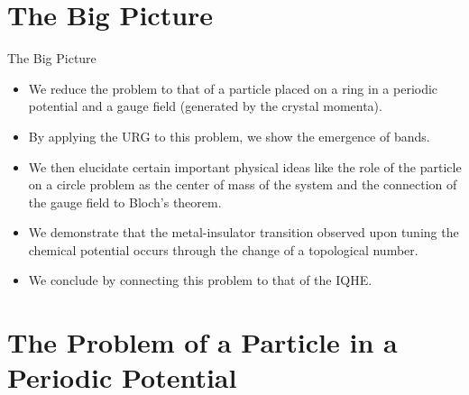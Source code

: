 \documentclass[aspectratio=169]{beamer}
\begin{document}
\section{The Big Picture}

\begin{frame}{The Big Picture}
\begin{itemize}[<+->]
	\item We reduce the problem to that of a \alert{particle placed on a ring} in a periodic potential and a gauge field (generated by the crystal momenta).\\[10pt]
	\item By applying the URG to this problem, we show the \alert{emergence of bands}.\\[10pt]
	\item We then elucidate certain important physical ideas like the role of the particle on a circle problem as the \alert{center of mass} of the system and the connection of the gauge field to Bloch’s theorem.\\[10pt]
	\item We demonstrate that the metal-insulator transition observed upon tuning the chemical potential occurs through the change of a \alert{topological number}.\\[10pt]
	\item We conclude by connecting this problem to that of the \alert{IQHE}.
\end{itemize}
\end{frame}

\section{The Problem of a Particle in a Periodic Potential}
\end{document}
